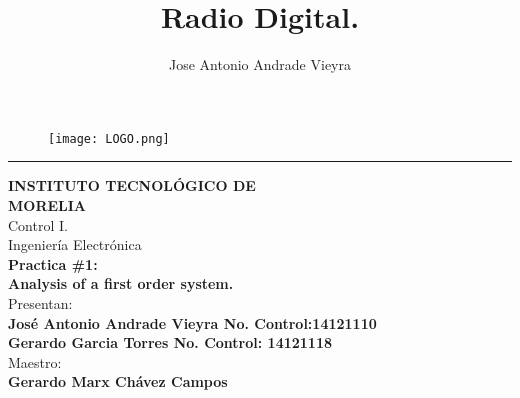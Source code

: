 \documentclass[12pt,a4paper]{article}
\author{Jose Antonio Andrade Vieyra}
\title{Radio Digital.}
\begin{document}
\begin{titlepage}
\begin{figure}[h!]
\centering
\texttt{[image: LOGO.png]}
\end{figure}
\hspace{1.3cm}\rule{14.5cm}{3pt} \hspace{-16.5cm}
\hspace{0.43cm} \hspace{0.43cm} \vspace{-19cm}
\begin{center}
\hspace{1.3cm} {\bf{\fontsize{20pt}{20pt} \selectfont INSTITUTO TECNOLÓGICO DE}}\\[0.5cm]
\hspace{1.3cm} {\bf{\fontsize{20pt}{20pt} \selectfont MORELIA}}\\[2cm]
\hspace{1.3cm} {\fontsize{20pt}{20pt} \selectfont Control I.}\\[1cm]
\hspace{1.3cm} {\fontsize{20pt}{20pt} \selectfont Ingeniería Electrónica}\\[1cm]
\hspace{1.3cm} {\bf{\fontsize{18pt}{18pt} \selectfont Practica \#1:}}\\[0.5cm]
\hspace{1.3cm} {\bf{\fontsize{18pt}{18pt} \selectfont Analysis of a first order system.}}\\[1.5cm]
\hspace{1.3cm} {\fontsize{16pt}{16pt} \selectfont Presentan:}\\[0.8cm]
\hspace{1.3cm} {\bf{\fontsize{14pt}{14pt} \selectfont José Antonio Andrade Vieyra No. Control:14121110}}\\[0.5cm]
\hspace{1.3cm} {\bf{\fontsize{14pt}{14pt} \selectfont Gerardo Garcia Torres No. Control: 14121118}}\\[1cm]
\hspace{1.3cm} {\fontsize{16pt}{16pt} \selectfont Maestro:}\\[0.5cm]
\hspace{1.3cm} {\bf{\fontsize{14pt}{14pt} \selectfont Gerardo Marx Chávez Campos}}
\end{center}   
\vspace{1.8cm}\hspace{1.3cm}
\end{titlepage}
\end{document}
